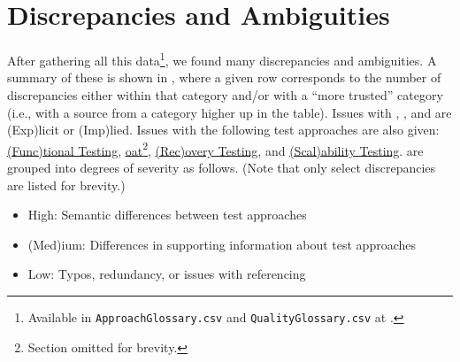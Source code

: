 \section{Discrepancies and Ambiguities}
\label{discrep}


After gathering all this data\footnote{Available in \texttt{ApproachGlossary.csv}
      and \texttt{QualityGlossary.csv} at
      .}, we found many discrepancies
and ambiguities. A summary
of these is shown in
, where a given row corresponds to the number of
discrepancies either within that category and/or with a ``more trusted''
category (i.e., with a source from a category higher up in the table). Issues
with , , and  are
(Exp)licit or (Imp)lied. Issues with the following test approaches are also
given: \hyperref[func-test-discrep]{(Func)tional Testing},
\hyperref[oat-discrep]{\acf{oat}\ifnotpaper\else\footnote{Section omitted for
                  brevity.}\fi}, \hyperref[recov-discrep]{(Rec)overy Testing},
and \hyperref[scal-discrep]{(Scal)ability Testing}. 
are grouped into degrees of severity as follows. (Note that only select
discrepancies are listed for brevity.)

\begin{itemize}
      \item High: Semantic differences between test approaches
      \item (Med)ium: Differences in supporting information about test approaches
      \item Low: Typos, redundancy, or issues with referencing
\end{itemize}

